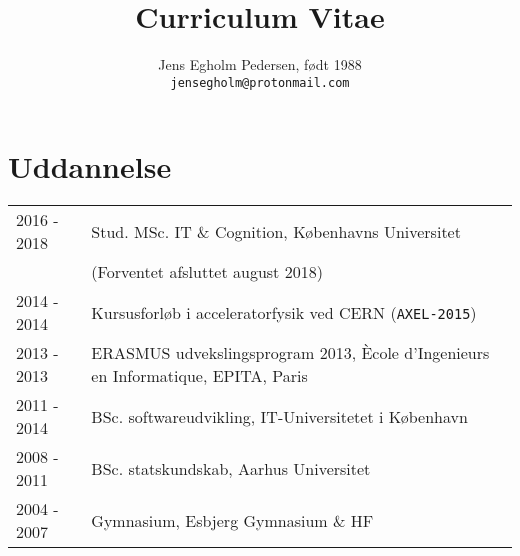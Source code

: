 \documentclass[12pt,a4paper,notitlepage]{article}
\author{Jens Egholm Pedersen, født 1988
\\ \texttt{jensegholm@protonmail.com}
}
\title{Curriculum Vitae}
\begin{document}
\maketitle

\section*{Uddannelse}
\begin{tabularx}{\textwidth}{l X}
2016 - 2018 & Stud. MSc. IT \& Cognition, Københavns Universitet \\
            & \hskip15pt (Forventet afsluttet august 2018) \\
2014 - 2014 & Kursusforløb i acceleratorfysik ved CERN (\texttt{AXEL-2015}) \\
2013 - 2013 & ERASMUS udvekslingsprogram 2013,
              Ècole d'Ingenieurs en Informatique, EPITA, Paris \\
2011 - 2014 & BSc. softwareudvikling, IT-Universitetet i København \\
2008 - 2011 & BSc. statskundskab, Aarhus Universitet \\
2004 - 2007 & Gymnasium, Esbjerg Gymnasium \& HF
\end{tabularx}
\end{document}
